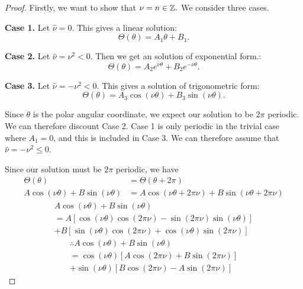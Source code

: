 \begin{proof}
  Firstly, we want to show that $\nu = n \in \mathbb{Z}.$ We consider three cases. \par
  \textbf{Case 1.} Let $\hat{\nu} = 0$. This gives a linear solution:
      \begin{equation}
          \Theta(\theta) = A_1 \theta + B_1.
      \end{equation}\par
  \textbf{Case 2.} Let $\hat{\nu} = \nu^2 < 0.$ Then we get an solution of exponential form.:
      \begin{equation}
          \Theta(\theta) = A_2 e^{\nu \theta} + B_2 e^{- \nu \theta}.
      \end{equation}\par
  \textbf{Case 3.} Let $\hat{\nu}= - \nu^2 < 0$. This gives a solution of trigonometric form:
      \begin{equation}
          \Theta(\theta) = A_3 \cos(\nu\theta) + B_3 \sin(\nu\theta).
      \end{equation}\par
  Since $\theta$ is the polar angular coordinate, we expect our solution to be $2\pi$ periodic. We can therefore discount Case 2. Case 1 is only periodic in the trivial case where $A_1 = 0$, and this is included in Case 3. We can therefore assume that $\hat{\nu} = - \nu^2 \leq 0$. \par
  Since our solution must be $2\pi$ periodic, we have
  \begin{align*}
    \Theta(\theta) &= \Theta(\theta+2 \pi)\\
    A \cos(\nu\theta) + B \sin(\nu \theta) &= A \cos(\nu\theta+2\pi\nu) + B \sin(\nu \theta + 2 \pi \nu)
  \end{align*}
  \begin{multline*}
      A \cos(\nu\theta) + B \sin(\nu \theta) \\
      = A [\cos(\nu\theta)\cos(2\pi\nu) - \sin(2\pi\nu)\sin(\nu\theta)] \\
      + B [\sin(\nu\theta)\cos(2\pi\nu) + \cos(\nu\theta)\sin(2\pi\nu)]
  \end{multline*}
  \begin{multline*}
      \therefore A\cos(\nu\theta) + B \sin(\nu \theta) \\
      = \cos(\nu\theta)[A\cos(2\pi\nu) + B\sin(2\pi\nu)] \\
      + \sin(\nu\theta)[B\cos(2\pi\nu) - A\sin(2\pi\nu)]
  \end{multline*}\par

\end{proof}
